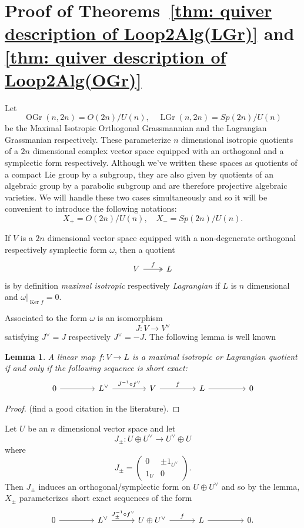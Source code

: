 \documentclass{amsart}
\newtheorem{lemma}[theorem]{Lemma}
\theoremstyle{definition}
\newcommand{\Ker}{\operatorname{Ker}}
\newcommand{\LGr}{\operatorname{LGr}}
\newcommand{\OGr}{\operatorname{OGr}}
\newcommand{\Xpm}{X_{\pm}}
\begin{document}
\section{Proof of Theorems~\ref{thm: quiver description of
Loop2Alg(LGr)} and \ref{thm: quiver description of
Loop2Alg(OGr)}}\label{sec: proofs of the Omega2(LG/OG) theorems}

Let 
\[
 \OGr (n,2n) = O(2n)/U(n), \quad \LGr (n,2n) = Sp(2n)/U(n)
\]
be the Maximal Isotropic Orthogonal Grassmannian and the Lagrangian
Grassmanian respectively. These parameterize $n$ dimensional isotropic
quotients of a $2n$ dimensional complex vector space equipped with an
orthogonal and a symplectic form respectively. Although we've written
these spaces as quotients of a compact Lie group by a subgroup, they
are also given by quotients of an algebraic group by a parabolic
subgroup and are therefore projective algebraic varieties. We will
handle these two cases simultaneously and so it will be convenient to
introduce the following notations:
\[
X_{+} = O(2n)/U(n), \quad X_{-} = Sp(2n)/U(n).
\]

If $V$ is a $2n$ dimensional vector space equipped with a
non-degenerate orthogonal respectively symplectic form $\omega$, then a
quotient
\[
\begin{tikzcd}
V \arrow[r,  two heads, "f"] & L
\end{tikzcd}
\]
is by definition \emph{maximal isotropic} respectively \emph{Lagrangian} if $L$ is
$n$ dimensional and $\omega |_{\Ker f} = 0$. 

Associated to the form $\omega$ is an isomorphism
\[
J : V\to V^{\vee } 
\]
satisfying $J^{\vee} = J$ respectively $J^{\vee}=-J$. The following
lemma is well known
\begin{lemma}\label{lem: lagrangian quotient condition as a ses}
A linear map $f:V\to L$ is a maximal isotropic or Lagrangian quotient if
and only if the following sequence is short exact:
\[
\begin{tikzcd}[column sep={6em,between origins}]
0 \arrow[r] &
L^{\vee } \arrow[r, "J^{-1}\circ f^{\vee}"] &
V \arrow[r, "f"] &
L \arrow[r] &
0
\end{tikzcd}
\]
\end{lemma}
\begin{proof}
 \cite[]{} {\color{red}(find a good citation in the literature)}.
\end{proof}


Let $U$ be an $n$ dimensional vector space and let 
\[
J_{\pm}: U\oplus U^{\vee} \to U^{\vee}\oplus U
\]
where 
\[
J_{\pm} = \begin{pmatrix}
        0 & \pm 1_{U^{\vee }}\\
        1_{U} & 0
      \end{pmatrix}.
\]
Then $J_{\pm}$ induces an orthogonal/symplectic form on $U\oplus
U^{\vee}$ and so by the lemma, $\Xpm$ parameterizes short exact
sequences of the form
\[
\begin{tikzcd}[column sep={6em,between origins}]
0 \arrow[r] &
L^{\vee } \arrow[r, "J_{\pm }^{-1}\circ f^{\vee}"] &
U\oplus U^{\vee } \arrow[r, "f"] &
L \arrow[r] &
0.
\end{tikzcd}
\]
\end{document}
